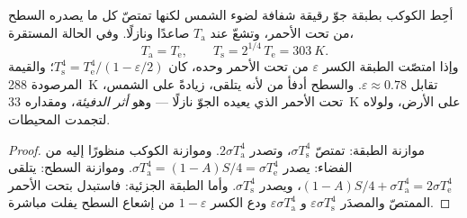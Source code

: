 \begin{proposition}\label{prop:b2:thermal-radiation:greenhouse}
أحِط الكوكب بطبقة جوّ رقيقة شفافة
لضوء الشمس لكنها تمتصّ كل ما يصدره السطح من تحت الأحمر، وتشعّ
 عند $T_{\text{a}}$ صاعدًا ونازلًا. وفي الحالة
المستقرة،
\[
T_{\text{a}} = T_{\text{e}}, \qquad
T_{\text{s}} = 2^{1/4}\,T_{\text{e}} = \qty{303}{K} .
\]
وإذا امتصّت الطبقة الكسر $\varepsilon$ من تحت الأحمر وحده،
كان $T_{\text{s}}^4 = T_{\text{e}}^4/(1 - \varepsilon/2)$؛ والقيمة المرصودة
\qty{288}{K} تقابل $\varepsilon \approx 0.78$. والسطح
أدفأ من  لأنه يتلقى، زيادةً
على الشمس، تحت الأحمر الذي يعيده الجوّ نازلًا --- وهو
\emph{أثر الدفيئة}، ومقداره \qty{33}{K} على الأرض،
ولولاه لتجمدت المحيطات.
\end{proposition}

\begin{proof}
موازنة الطبقة: تمتصّ $\sigma T_{\text{s}}^4$، وتصدر $2\sigma
T_{\text{a}}^4$. وموازنة الكوكب منظورًا إليه من الفضاء: يصدر $\sigma
T_{\text{a}}^4 = (1 - A)S/4 = \sigma T_{\text{e}}^4$. وموازنة
السطح: يتلقى $(1 - A)S/4 + \sigma T_{\text{a}}^4 = 2\sigma T_{\text{e}}^4$،
ويصدر $\sigma T_{\text{s}}^4$. وأما الطبقة الجزئية: فاستبدل بتحت الأحمر
الممتصّ والمصدَر $\varepsilon\sigma T_{\text{s}}^4$ و
$\varepsilon\sigma T_{\text{a}}^4$ ودع الكسر $1 - \varepsilon$
من إشعاع السطح يفلت مباشرة.
\end{proof}

